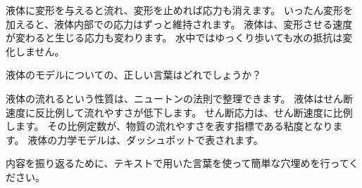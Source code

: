 \documentclass[uplatex,dvipdfmx,a4paper,11pt]{jsreport}
\begin{document}
\begin{qlist}
\begin{qlist2}
            \qitem 液体に変形を与えると流れ、変形を止めれば応力も消えます。
            \qitem いったん変形を加えると、液体内部での応力はずっと維持されます。
            \qitem 液体は、変形させる速度が変わると生じる応力も変わります。
            \qitem 水中ではゆっくり歩いても水の抵抗は変化しません。
        \end{qlist2}
      \vspace{3mm}
        \qitem 液体のモデルについての、正しい言葉はどれでしょうか？
        \begin{qlist2}
            \qitem 液体の流れるという性質は、ニュートンの法則で整理できます。
            \qitem 液体はせん断速度に反比例して流れやすさが低下します。
            \qitem せん断応力は、せん断速度に比例します。
            \qitem その比例定数が、物質の流れやすさを表す指標である粘度となります。
            \qitem 液体の力学モデルは、ダッシュポットで表されます。
        \end{qlist2}
    \end{qlist}
    
    内容を振り返るために、テキストで用いた言葉を使って簡単な穴埋めを行ってください。
    
\end{document}
